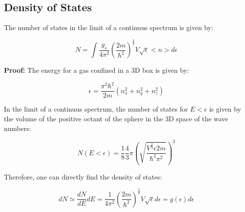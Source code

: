 \documentclass{article}
\begin{document}
\subsection{Density of States}

\begin{tcolorbox}[colframe=gray!50, colback=gray!10, coltitle=black, title=Number of states]
    The number of states in the limit of a continuus spectrum is given by:

    \begin{equation}
        N=\int \frac{g_s}{4\pi^2}\left( \frac{2m}{\hbar^2} \right)^{\frac{3}{2}}V\sqrt{\epsilon} <n>d\epsilon
    \end{equation}
\end{tcolorbox}

\textbf{Proof:}
The energy for a gas confined in a 3D box is given by:

\begin{equation}
    \epsilon=\frac{\pi^2\hbar^2}{2m}(n_x^2+n_y^2+n_z^2)
\end{equation}

In the limit of a continuus spectrum, the number of states for $E<\epsilon$ is given by the volume of the
positive octant of the sphere in the 3D space of the wave numbers:

\begin{equation}
    N(E<\epsilon)= \frac{1}{8} \frac{4}{3}\pi \left(\sqrt{\frac{V^\frac{2}{3} \epsilon 2m}{\hbar^2\pi^2}}\right)^3
\end{equation}

Therefore, one can directly find the density of states:

\begin{equation}
    dN\simeq\frac{dN}{dE}dE=\frac{1}{4\pi^2}\left(\frac{2m}{\hbar^2}\right)^{\frac{3}{2}}V\sqrt{\epsilon}d\epsilon=g(\epsilon)d\epsilon
\end{equation}
\end{document}
